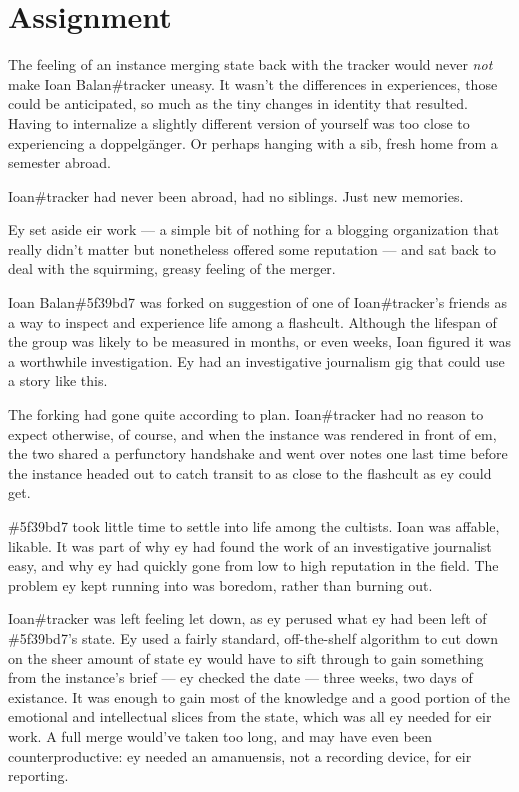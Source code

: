\chapter{Assignment}

The feeling of an instance merging state back with the tracker would never \emph{not} make Ioan Balan\#tracker uneasy. It wasn't the differences in experiences, those could be anticipated, so much as the tiny changes in identity that resulted. Having to internalize a slightly different version of yourself was too close to experiencing a doppelgänger. Or perhaps hanging with a sib, fresh home from a semester abroad.

Ioan\#tracker had never been abroad, had no siblings. Just new memories.

Ey set aside eir work --- a simple bit of nothing for a blogging organization that really didn't matter but nonetheless offered some reputation --- and sat back to deal with the squirming, greasy feeling of the merger.

\secdiv{}

\noindent Ioan Balan\#5f39bd7 was forked on suggestion of one of Ioan\#tracker's friends as a way to inspect and experience life among a flashcult. Although the lifespan of the group was likely to be measured in months, or even weeks, Ioan figured it was a worthwhile investigation. Ey had an investigative journalism gig that could use a story like this.

The forking had gone quite according to plan. Ioan\#tracker had no reason to expect otherwise, of course, and when the instance was rendered in front of em, the two shared a perfunctory handshake and went over notes one last time before the instance headed out to catch transit to as close to the flashcult as ey could get.

\#5f39bd7 took little time to settle into life among the cultists. Ioan was affable, likable. It was part of why ey had found the work of an investigative journalist easy, and why ey had quickly gone from low to high reputation in the field. The problem ey kept running into was boredom, rather than burning out.

\secdiv{}

\noindent Ioan\#tracker was left feeling let down, as ey perused what ey had been left of \#5f39bd7's state. Ey used a fairly standard, off-the-shelf algorithm to cut down on the sheer amount of state ey would have to sift through to gain something from the instance's brief --- ey checked the date --- three weeks, two days of existance. It was enough to gain most of the knowledge and a good portion of the emotional and intellectual slices from the state, which was all ey needed for eir work. A full merge would've taken too long, and may have even been counterproductive: ey needed an amanuensis, not a recording device, for eir reporting.

